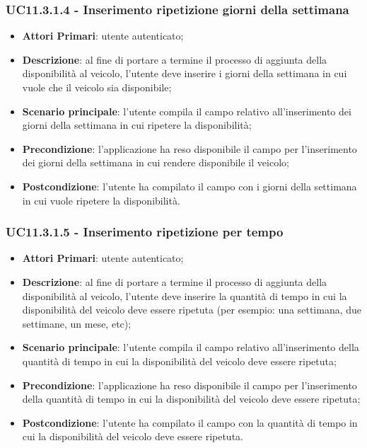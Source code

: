 \subsubsection{UC11.3.1.4 - Inserimento ripetizione giorni della settimana}
\begin{itemize}
	\item \textbf{Attori Primari}: utente autenticato;
	\item \textbf{Descrizione}: al fine di portare a termine il processo di aggiunta della disponibilità al veicolo, l'utente deve inserire i giorni della settimana in cui vuole che il veicolo sia disponibile;
	\item \textbf{Scenario principale}: l'utente compila il campo relativo all'inserimento dei giorni della settimana in cui ripetere la disponibilità;	
	\item \textbf{Precondizione}: l'applicazione ha reso disponibile il campo per l'inserimento dei giorni della settimana in cui rendere disponibile il veicolo;
	\item \textbf{Postcondizione}: l'utente ha compilato il campo con i giorni della settimana in cui vuole ripetere la disponibilità.	
\end{itemize}
\subsubsection{UC11.3.1.5 - Inserimento ripetizione per tempo}
\begin{itemize}
	\item \textbf{Attori Primari}: utente autenticato;
	\item \textbf{Descrizione}: al fine di portare a termine il processo di aggiunta della disponibilità al veicolo, l'utente deve inserire la quantità di tempo in cui la disponibilità del veicolo deve essere ripetuta (per esempio: una settimana, due settimane, un mese, etc);
	\item \textbf{Scenario principale}: l'utente compila il campo relativo all'inserimento della quantità di tempo in cui la disponibilità del veicolo deve essere ripetuta;	
	\item \textbf{Precondizione}: l'applicazione ha reso disponibile il campo per l'inserimento della quantità di tempo in cui la disponibilità del veicolo deve essere ripetuta;
	\item \textbf{Postcondizione}: l'utente ha compilato il campo con la quantità di tempo in cui la disponibilità del veicolo deve essere ripetuta.	
\end{itemize}
